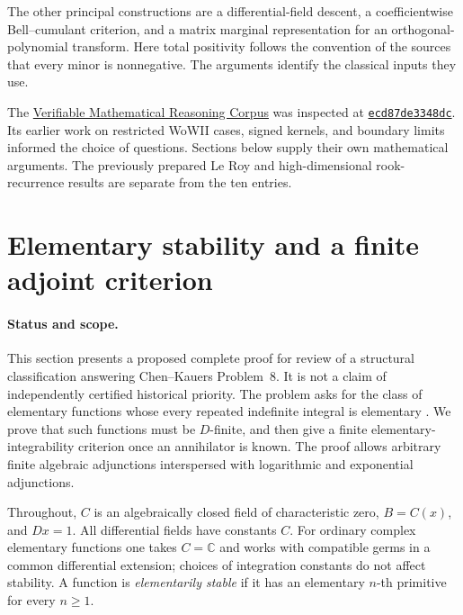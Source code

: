 \documentclass[11pt,a4paper]{article}
\theoremstyle{definition}
\theoremstyle{remark}
\numberwithin{equation}{section}
\begin{document}
The other principal constructions are a differential-field descent,
a coefficientwise Bell--cumulant criterion, and a matrix marginal
representation for an orthogonal-polynomial transform. Here total
positivity follows the convention of the sources that every minor is
nonnegative. The arguments identify the classical inputs they use.

The \href{https://github.com/QEEDDD/Verifiable-Mathematical-Reasoning-Corpus}{Verifiable Mathematical Reasoning Corpus}
was inspected at
\href{https://github.com/QEEDDD/Verifiable-Mathematical-Reasoning-Corpus/commit/ecd87de3348dcb706a76bb12fde722d7a348a012}{\texttt{ecd87de3348dc}}.
Its earlier work on restricted WoWII cases, signed kernels, and boundary
limits informed the choice of questions. Sections below supply their own
mathematical arguments. The previously prepared Le Roy and high-dimensional
rook-recurrence results are separate from the ten entries.

\tableofcontents
\bigskip


\section{Elementary stability and a finite adjoint criterion}
\label{stab:section}

\paragraph{Status and scope.}
This section presents a proposed complete proof for review of a structural
classification answering Chen--Kauers Problem~8.  It is not a claim of
independently certified historical priority.  The problem asks for the class
of elementary functions whose every repeated indefinite integral is
elementary \cite[Problem~8]{stab:CK}.  We prove that such functions must be
$D$-finite, and then give a finite elementary-integrability criterion once
an annihilator is known.  The proof allows arbitrary finite algebraic
adjunctions interspersed with logarithmic and exponential adjunctions.

Throughout, $C$ is an algebraically closed field of characteristic zero,
$B=C(x)$, and $D x=1$.  All differential fields have constants $C$.
For ordinary complex elementary functions one takes $C=\mathbb C$ and
works with compatible germs in a common differential extension; choices
of integration constants do not affect stability.  A function is
\emph{elementarily stable} if it has an elementary $n$-th primitive for
every $n\geq 1$.
\end{document}
